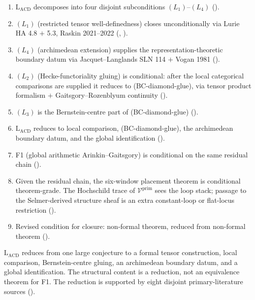 \begin{enumerate}
\item \(\mathrm{L}_{\mathrm{ACD}}\) decomposes into four disjoint
subconditions \((L_{1})\)--\((L_{4})\)
().
\item \((L_{1})\) (restricted tensor well-definedness) closes
unconditionally via Lurie HA 4.8 \(+\) 5.3, Raskin 2021--2022
(,
).
\item \((L_{4})\) (archimedean extension) supplies the
representation-theoretic boundary datum via Jacquet--Langlands SLN 114
\(+\) Vogan 1981
().
\item \((L_{2})\) (Hecke-functoriality gluing) is conditional:
after the local categorical comparisons are supplied it reduces
to (BC-diamond-glue), via tensor product formalism \(+\)
Gaitsgory--Rozenblyum continuity
().
\item \((L_{3})\) is the Bernstein-centre part of (BC-diamond-glue)
().
\item \(\mathrm{L}_{\mathrm{ACD}}\) reduces to local comparison,
(BC-diamond-glue), the archimedean boundary datum, and the global
identification
().
\item F1 (global arithmetic Arinkin--Gaitsgory) is conditional on the
same residual chain
().
\item Given the residual chain, the six-window placement theorem
is conditional theorem-grade.  The Hochschild trace of
\(\mathcal{V}^{\mathrm{prim}}\) sees the loop stack; passage to the
Selmer-derived structure sheaf is an extra constant-loop or flat-locus
restriction
().
\item Revised condition for closure: non-formal theorem, reduced from
non-formal theorem ().
\end{enumerate}

\(\mathrm{L}_{\mathrm{ACD}}\) reduces from one large conjecture to a
formal tensor construction, local comparison, Bernstein-centre gluing,
an archimedean boundary datum, and a global identification.  The
structural content is a reduction, not an equivalence theorem for F1.
The reduction is supported by eight disjoint primary-literature sources
().

